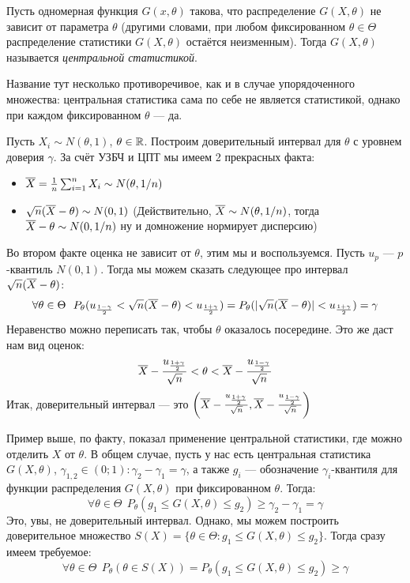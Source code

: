 \begin{definition}
	Пусть одномерная функция $G(x, \theta)$ такова, что распределение $G(X, \theta)$ не зависит от параметра $\theta$ (другими словами, при любом фиксированном $\theta \in \Theta$ распределение статистики $G(X, \theta)$ остаётся неизменным). Тогда $G(X, \theta)$ называется \textit{центральной статистикой}.
\end{definition}

\begin{anote}
	Название тут несколько противоречивое, как и в случае упорядоченного множества: центральная статистика сама по себе не является статистикой, однако при каждом фиксированном $\theta$ --- да.
\end{anote}

\begin{example}
	Пусть $X_i \sim N(\theta, 1)$, $\theta \in \mathbb{R}$. Построим доверительный интервал для $\theta$ с уровнем доверия $\gamma$. За счёт УЗБЧ и ЦПТ мы имеем 2 прекрасных факта:
	\begin{itemize}
		\item $\overline{X} = \frac{1}{n}\sum_{i = 1}^n X_i \sim N(\theta, 1 / n)$
		
		\item $\sqrt{n}(\overline{X} - \theta) \sim N(0, 1)$ (Действительно, $\overline{X} \sim N(\theta, 1 / n)$, тогда $\overline{X} - \theta \sim N(0, 1 / n)$ ну и домножение нормирует дисперсию)
	\end{itemize}
	Во втором факте оценка не зависит от $\theta$, этим мы и воспользуемся. Пусть $u_p$ --- $p$-квантиль $N(0, 1)$. Тогда мы можем сказать следующее про интервал $\sqrt{n}(\overline{X} - \theta)$:
	\[
		\forall \theta \in \Theta\ \ P_\theta(u_{\frac{1 - \gamma}{2}} < \sqrt{n}(\overline{X} - \theta) < u_{\frac{1 + \gamma}{2}}) = P_\theta(|\sqrt{n}(\overline{X} - \theta)| < u_{\frac{1 + \gamma}{2}}) = \gamma
	\]
	Неравенство можно переписать так, чтобы $\theta$ оказалось посередине. Это же даст нам вид оценок:
	\[
		 \overline{X} - \frac{u_{\frac{1 + \gamma}{2}}}{\sqrt{n}} < \theta < \overline{X} - \frac{u_{\frac{1 - \gamma}{2}}}{\sqrt{n}}
	\]
	Итак, доверительный интервал --- это $\left(\overline{X} - \frac{u_{\frac{1 + \gamma}{2}}}{\sqrt{n}}, \overline{X} - \frac{u_{\frac{1 - \gamma}{2}}}{\sqrt{n}}\right)$
\end{example}

\begin{note}
	Пример выше, по факту, показал применение центральной статистики, где можно отделить $X$ от $\theta$. В общем случае, пусть у нас есть центральная статистика $G(X, \theta)$, $\gamma_{1, 2} \in (0; 1) \colon \gamma_2 - \gamma_1 = \gamma$, а также $g_i$ --- обозначение $\gamma_i$-квантиля для функции распределения $G(X, \theta)$ при фиксированном $\theta$. Тогда:
	\[
		\forall \theta \in \Theta\ \ P_\theta(g_1 \le G(X, \theta) \le g_2) \ge \gamma_2 - \gamma_1 = \gamma
	\]
	Это, увы, не доверительный интервал. Однако, мы можем построить доверительное множество $S(X) = \{\theta \in \Theta \colon g_1 \le G(X, \theta) \le g_2\}$. Тогда сразу имеем требуемое:
	\[
		\forall \theta \in \Theta\ \ P_\theta(\theta \in S(X)) = P_\theta(g_1 \le G(X, \theta) \le g_2) \ge \gamma
	\]
\end{note}

